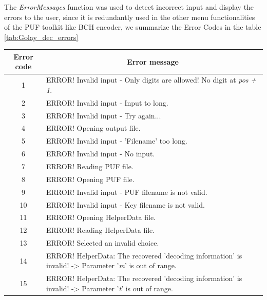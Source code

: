 The \emph{ErrorMessages} function was used to detect incorrect input and display the errors to the user, since it is redundantly used in the other menu functionalities of the PUF toolkit like BCH encoder, we summarize the Error Codes in the table \ref{tab:Golay_dec_errors}

\begin{table}[!ht]
\begin{center}
\begin{tabular}{cp{13cm}}
\toprule
\multicolumn{1}{c}{\textbf{Error code}} & \multicolumn{1}{c}{\textbf{Error message}} \\
\midrule
\hline
1 & ERROR! Invalid input - Only digits are allowed! No digit at \emph{pos + 1}.\\

2 & ERROR! Invalid input - Input to long. \\

3 & ERROR! Invalid input - Try again...  \\

4 & ERROR! Opening output file. \\

5 & ERROR! Invalid input - 'Filename' too long. \\

6 & ERROR! Invalid input - No input. \\

7 & ERROR! Reading PUF file. \\

8 & ERROR! Opening PUF file. \\

9 & ERROR! Invalid input - PUF filename is not valid.\\

10 & ERROR! Invalid input - Key filename is not valid.\\

11 & ERROR! Opening HelperData file. \\

12 & ERROR! Reading HelperData file. \\

13 & ERROR! Selected an invalid choice. \\

14 & ERROR! HelperData: The recovered 'decoding information' is invalid! -> Parameter '\emph{m}' is out of range.\\

15 & ERROR! HelperData: The recovered 'decoding information' is invalid! -> Parameter '\emph{t}' is out of range.\\


\end{tabular}
\end{center}
\end{table}
